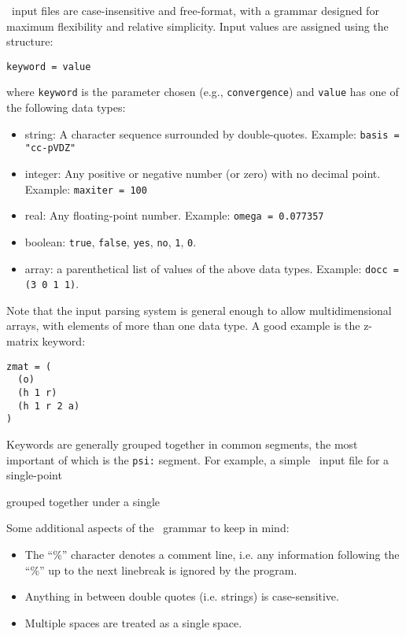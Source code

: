 \PSIthree\ input files are case-insensitive and free-format, with
a grammar designed for maximum flexibility and relative simplicity.
Input values are assigned using the structure:
\begin{verbatim}
keyword = value
\end{verbatim}
where {\tt keyword} is the parameter chosen (e.g., {\tt convergence})
and {\tt value} has one of the following data types:
\begin{itemize}
\item string: A character sequence surrounded by double-quotes.
  Example: {\tt basis = "cc-pVDZ"}
\item integer: Any positive or negative number (or zero) with no
  decimal point.  Example: {\tt maxiter = 100}
\item real: Any floating-point number.  Example: {\tt omega = 0.077357}
\item boolean: {\tt true}, {\tt false}, {\tt yes}, {\tt no}, {\tt 1},
  {\tt 0}.
\item array: a parenthetical list of values of the above data types.
  Example: {\tt docc = (3 0 1 1)}.  
\end{itemize}
Note that the input parsing system is general enough to allow
multidimensional arrays, with elements of more than one data type.  A
good example is the z-matrix keyword:
\begin{verbatim}
zmat = (
  (o)
  (h 1 r)
  (h 1 r 2 a)
)
\end{verbatim}

Keywords are generally grouped together in common segments, the most
important of which is the {\tt psi:} segment.  For example, a simple
\PSIthree\ input file for a single-point 

grouped together under a single 


Some additional aspects of the \PSIthree\ grammar to keep in mind:
\begin{itemize}
\item The ``\%'' character denotes a comment line, i.e. any
  information following the ``\%'' up to the next linebreak is ignored
  by the program.
\item Anything in between double quotes (i.e. strings) is case-sensitive.
\item Multiple spaces are treated as a single space.
\end{itemize}
